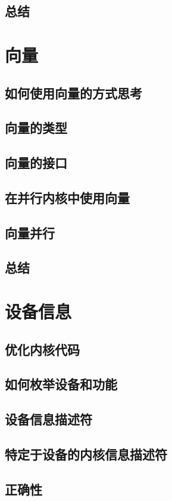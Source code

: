 \documentclass[11pt,a4paper,UTF8]{ctexart}
\begin{document}
		\subsection{总结}
	\section{向量}
		\subsection{如何使用向量的方式思考}
		\subsection{向量的类型}
		\subsection{向量的接口}
		\subsection{在并行内核中使用向量}
		\subsection{向量并行}
		\subsection{总结}
	\section{设备信息}
		\subsection{优化内核代码}
		\subsection{如何枚举设备和功能}
		\subsection{设备信息描述符}
		\subsection{特定于设备的内核信息描述符}
		\subsection{正确性}
\end{document}
